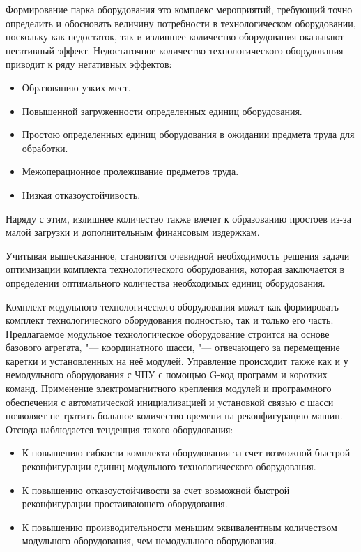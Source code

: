 Формирование парка оборудования это комплекс мероприятий, требующий точно определить и обосновать величину потребности в технологическом оборудовании, поскольку как недостаток, так и излишнее количество оборудования оказывают негативный эффект. Недостаточное количество технологического оборудования  приводит к ряду негативных эффектов:

\begin{itemize}
	\item Образованию узких мест.
	\item Повышенной загруженности определенных единиц оборудования.
	\item Простою определенных единиц оборудования в ожидании предмета труда для обработки.
	\item Межоперационное пролеживание предметов труда.
	\item Низкая отказоустойчивость.
\end{itemize}


Наряду с этим, излишнее количество также влечет к образованию простоев из-за малой загрузки и дополнительным финансовым издержкам. 

Учитывая вышесказанное, становится очевидной необходимость решения задачи оптимизации комплекта технологического оборудования, которая заключается в определении оптимального количества необходимых единиц оборудования.

Комплект модульного технологического оборудования может как формировать комплект технологического оборудования полностью, так и только его часть. Предлагаемое модульное технологическое оборудование строится на основе базового агрегата, "--- координатного шасси, "--- отвечающего за перемещение каретки и установленных на неё модулей. Управление происходит также как и у немодульного оборудования с ЧПУ с помощью G-код программ и коротких команд. Применение электромагнитного крепления модулей и программного обеспечения с автоматической инициализацией и установкой связью с шасси позволяет не тратить большое количество времени на реконфигурацию машин. Отсюда наблюдается тенденция такого оборудования:

\begin{itemize}
	\item К повышению гибкости комплекта оборудования за счет возможной быстрой реконфигурации единиц модульного технологического оборудования.
	\item К повышению отказоустойчивости за счет возможной быстрой реконфигурации простаивающего оборудования.
	\item К повышению производительности меньшим эквивалентным количеством модульного оборудования, чем немодульного оборудования.
\end{itemize}


